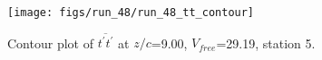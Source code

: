 \begin{figure}[H]
\centering
\texttt{[image: figs/run\_48/run\_48\_tt\_contour]}
\caption{Contour plot of $\overline{t^\prime t^\prime}$ at $z/c$=9.00, $V_{free}$=29.19, station 5.}
\end{figure}


